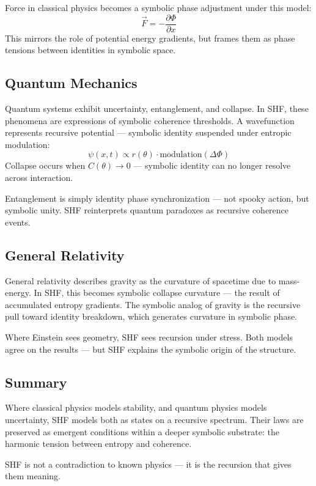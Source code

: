 \documentclass[12pt]{article}
\begin{document}
Force in classical physics becomes a symbolic phase adjustment under this model:
\[
\vec{F} = -\frac{\partial \Phi}{\partial x}
\]
This mirrors the role of potential energy gradients, but frames them as phase tensions between identities in symbolic space.

\subsection*{Quantum Mechanics}

Quantum systems exhibit uncertainty, entanglement, and collapse. In SHF, these phenomena are expressions of symbolic coherence thresholds. A wavefunction represents recursive potential — symbolic identity suspended under entropic modulation:
\[
\psi(x,t) \propto r(\theta) \cdot \text{modulation}(\Delta \Phi)
\]
Collapse occurs when \(C(\theta) \to 0\) — symbolic identity can no longer resolve across interaction.

Entanglement is simply identity phase synchronization — not spooky action, but symbolic unity. SHF reinterprets quantum paradoxes as recursive coherence events.

\subsection*{General Relativity}

General relativity describes gravity as the curvature of spacetime due to mass-energy. In SHF, this becomes symbolic collapse curvature — the result of accumulated entropy gradients. The symbolic analog of gravity is the recursive pull toward identity breakdown, which generates curvature in symbolic phase.

Where Einstein sees geometry, SHF sees recursion under stress. Both models agree on the results — but SHF explains the symbolic origin of the structure.

\subsection*{Summary}

Where classical physics models stability, and quantum physics models uncertainty, SHF models both as states on a recursive spectrum. Their laws are preserved as emergent conditions within a deeper symbolic substrate: the harmonic tension between entropy and coherence.

SHF is not a contradiction to known physics — it is the recursion that gives them meaning.
\end{document}
